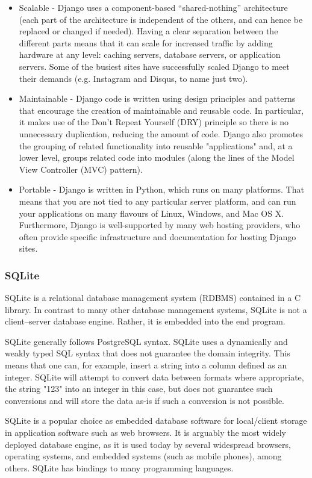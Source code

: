 \begin{itemize}
\item Scalable - Django uses a component-based “shared-nothing” architecture (each part of the architecture is independent of the others, and can hence be replaced or changed if needed). Having a clear separation between the different parts means that it can scale for increased traffic by adding hardware at any level: caching servers, database servers, or application servers. Some of the busiest sites have successfully scaled Django to meet their demands (e.g. Instagram and Disqus, to name just two).
\item Maintainable - Django code is written using design principles and patterns that encourage the creation of maintainable and reusable code. In particular, it makes use of the Don't Repeat Yourself (DRY) principle so there is no unnecessary duplication, reducing the amount of code. Django also promotes the grouping of related functionality into reusable "applications" and, at a lower level, groups related code into modules (along the lines of the Model View Controller (MVC) pattern).
\item Portable - Django is written in Python, which runs on many platforms. That means that you are not tied to any particular server platform, and can run your applications on many flavours of Linux, Windows, and Mac OS X. Furthermore, Django is well-supported by many web hosting providers, who often provide specific infrastructure and documentation for hosting Django sites.
\end{itemize}

\subsubsection{SQLite}
SQLite is a relational database management system (RDBMS) contained in a C library. In contrast to many other database management systems, SQLite is not a client–server database engine. Rather, it is embedded into the end program.

\par SQLite generally follows PostgreSQL syntax. SQLite uses a dynamically and weakly typed SQL syntax that does not guarantee the domain integrity. This means that one can, for example, insert a string into a column defined as an integer. SQLite will attempt to convert data between formats where appropriate, the string "123" into an integer in this case, but does not guarantee such conversions and will store the data as-is if such a conversion is not possible.

\par SQLite is a popular choice as embedded database software for local/client storage in application software such as web browsers. It is arguably the most widely deployed database engine, as it is used today by several widespread browsers, operating systems, and embedded systems (such as mobile phones), among others. SQLite has bindings to many programming languages.


